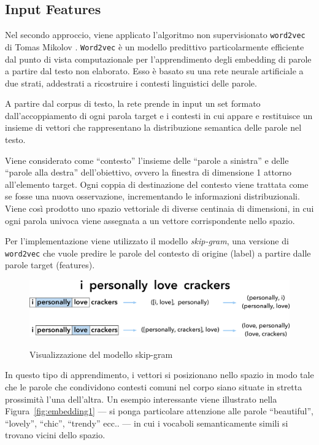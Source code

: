\subsection{Input Features}
\label{subsec:features2}

Nel secondo approccio, viene applicato l'algoritmo non supervisionato \texttt{word2vec} di Tomas Mikolov  \cite{mikolov2013efficient}. 
\texttt{Word2vec} è un modello predittivo particolarmente efficiente dal punto di vista computazionale per l'apprendimento degli embedding di parole a partire dal testo non elaborato.
Esso è basato su una rete neurale artificiale a due strati, addestrati a ricostruire i contesti linguistici delle parole. 

A partire dal corpus di testo, la rete prende in input un set formato dall'accoppiamento di ogni parola target e i contesti in cui appare e restituisce un insieme di vettori che rappresentano la distribuzione semantica delle parole nel testo. 

Viene considerato come ``contesto'' l'insieme delle ``parole a sinistra'' e delle ``parole alla destra'' dell'obiettivo, ovvero la finestra di dimensione 1 attorno all'elemento target. Ogni coppia di destinazione del contesto viene trattata come se fosse una nuova osservazione, incrementando le informazioni distribuzionali. Viene così prodotto uno spazio vettoriale di diverse centinaia di dimensioni, in cui ogni parola univoca viene assegnata a un vettore corrispondente nello spazio.

Per l'implementazione viene utilizzato il modello \emph{skip-gram}, una versione di \texttt{word2vec} che vuole predire le parole del contesto di origine (label) a partire dalle parole target (features).

\begin{figure}[H]
	\centering
	{\includegraphics[width=.7\textwidth]{images/skip-gram}} 
	\caption{Visualizzazione del modello skip-gram}
	\label{fig:mikolov}
\end{figure}

In questo tipo di apprendimento, i vettori si posizionano nello spazio in modo tale che le parole che condividono contesti comuni nel corpo siano situate in stretta prossimità l'una dell'altra. Un esempio interessante viene illustrato nella Figura~\ref{fig:embedding1} --- si ponga particolare attenzione alle parole ``beautiful'', ``lovely'', ``chic'', ``trendy'' ecc.. --- in cui i vocaboli semanticamente simili si trovano vicini dello spazio.

